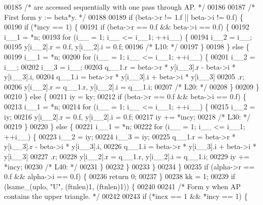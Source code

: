 \begin{DoxyCode}
00185 \textcolor{comment}{/*     are accessed sequentially with one pass through AP. */}
00186 
00187 \textcolor{comment}{/*     First form  y := beta*y. */}
00188 
00189     \textcolor{keywordflow}{if} (beta->r != 1.f || beta->i != 0.f) \{
00190     \textcolor{keywordflow}{if} (*incy == 1) \{
00191         \textcolor{keywordflow}{if} (beta->r == 0.f && beta->i == 0.f) \{
00192         i\_\_1 = *n;
00193         \textcolor{keywordflow}{for} (i\_\_ = 1; i\_\_ <= i\_\_1; ++i\_\_) \{
00194             i\_\_2 = i\_\_;
00195             y[i\_\_2].r = 0.f, y[i\_\_2].i = 0.f;
00196 \textcolor{comment}{/* L10: */}
00197         \}
00198         \} \textcolor{keywordflow}{else} \{
00199         i\_\_1 = *n;
00200         \textcolor{keywordflow}{for} (i\_\_ = 1; i\_\_ <= i\_\_1; ++i\_\_) \{
00201             i\_\_2 = i\_\_;
00202             i\_\_3 = i\_\_;
00203             q\_\_1.r = beta->r * y[i\_\_3].r - beta->i * y[i\_\_3].i, 
00204                 q\_\_1.i = beta->r * y[i\_\_3].i + beta->i * y[i\_\_3]
00205                 .r;
00206             y[i\_\_2].r = q\_\_1.r, y[i\_\_2].i = q\_\_1.i;
00207 \textcolor{comment}{/* L20: */}
00208         \}
00209         \}
00210     \} \textcolor{keywordflow}{else} \{
00211         iy = ky;
00212         \textcolor{keywordflow}{if} (beta->r == 0.f && beta->i == 0.f) \{
00213         i\_\_1 = *n;
00214         \textcolor{keywordflow}{for} (i\_\_ = 1; i\_\_ <= i\_\_1; ++i\_\_) \{
00215             i\_\_2 = iy;
00216             y[i\_\_2].r = 0.f, y[i\_\_2].i = 0.f;
00217             iy += *incy;
00218 \textcolor{comment}{/* L30: */}
00219         \}
00220         \} \textcolor{keywordflow}{else} \{
00221         i\_\_1 = *n;
00222         \textcolor{keywordflow}{for} (i\_\_ = 1; i\_\_ <= i\_\_1; ++i\_\_) \{
00223             i\_\_2 = iy;
00224             i\_\_3 = iy;
00225             q\_\_1.r = beta->r * y[i\_\_3].r - beta->i * y[i\_\_3].i, 
00226                 q\_\_1.i = beta->r * y[i\_\_3].i + beta->i * y[i\_\_3]
00227                 .r;
00228             y[i\_\_2].r = q\_\_1.r, y[i\_\_2].i = q\_\_1.i;
00229             iy += *incy;
00230 \textcolor{comment}{/* L40: */}
00231         \}
00232         \}
00233     \}
00234     \}
00235     \textcolor{keywordflow}{if} (alpha->r == 0.f && alpha->i == 0.f) \{
00236     \textcolor{keywordflow}{return} 0;
00237     \}
00238     kk = 1;
00239     \textcolor{keywordflow}{if} (lsame\_(uplo, \textcolor{stringliteral}{"U"}, (ftnlen)1, (ftnlen)1)) \{
00240 
00241 \textcolor{comment}{/*        Form  y  when AP contains the upper triangle. */}
00242 
00243     \textcolor{keywordflow}{if} (*incx == 1 && *incy == 1) \{

\end{DoxyCode}
